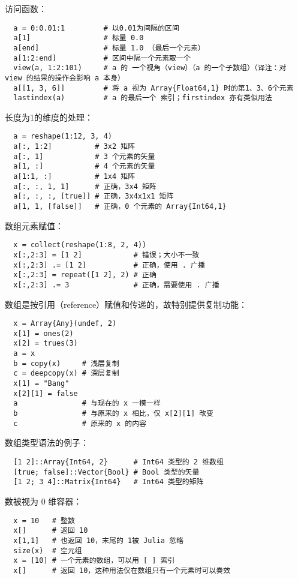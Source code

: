 \documentclass[10pt,a4paper]{article}
\begin{document}
访问函数：
\begin{lstlisting}
  a = 0:0.01:1         # 以0.01为间隔的区间
  a[1]                 # 标量 0.0
  a[end]               # 标量 1.0 （最后一个元素）
  a[1:2:end]           # 区间中隔一个元素取一个
  view(a, 1:2:101)     # a 的 一个视角（view）（a 的一个子数组）（译注：对 view 的结果的操作会影响 a 本身）
  a[[1, 3, 6]]         # 将 a 视为 Array{Float64,1} 时的第1、3、6个元素
  lastindex(a)         # a 的最后一个 索引；firstindex 亦有类似用法 
\end{lstlisting}

长度为1的维度的处理：
\begin{lstlisting}
  a = reshape(1:12, 3, 4)
  a[:, 1:2]          # 3x2 矩阵
  a[:, 1]            # 3 个元素的矢量
  a[1, :]            # 4 个元素的矢量
  a[1:1, :]          # 1x4 矩阵
  a[:, :, 1, 1]      # 正确，3x4 矩阵
  a[:, :, :, [true]] # 正确，3x4x1x1 矩阵
  a[1, 1, [false]]   # 正确，0 个元素的 Array{Int64,1}
\end{lstlisting}

数组元素赋值：
\begin{lstlisting}
  x = collect(reshape(1:8, 2, 4))
  x[:,2:3] = [1 2]            # 错误；大小不一致
  x[:,2:3] .= [1 2]           # 正确，使用 . 广播
  x[:,2:3] = repeat([1 2], 2) # 正确
  x[:,2:3] .= 3               # 正确，需要使用 . 广播
\end{lstlisting}

数组是按引用（reference）赋值和传递的，故特别提供复制功能：
\begin{lstlisting}
  x = Array{Any}(undef, 2)
  x[1] = ones(2)
  x[2] = trues(3)
  a = x
  b = copy(x)     # 浅层复制
  c = deepcopy(x) # 深层复制
  x[1] = "Bang"
  x[2][1] = false
  a               # 与现在的 x 一模一样
  b               # 与原来的 x 相比，仅 x[2][1] 改变
  c               # 原来的 x 的内容
\end{lstlisting}

数组类型语法的例子：
\begin{lstlisting}
  [1 2]::Array{Int64, 2}      # Int64 类型的 2 维数组
  [true; false]::Vector{Bool} # Bool 类型的矢量
  [1 2; 3 4]::Matrix{Int64}   # Int64 类型的矩阵
\end{lstlisting}

数被视为 0 维容器：
\begin{lstlisting}
  x = 10   # 整数
  x[]      # 返回 10
  x[1,1]   # 也返回 10，末尾的 1被 Julia 忽略
  size(x)  # 空元组
  x = [10] # 一个元素的数组，可以用 [ ] 索引
  x[]      # 返回 10，这种用法仅在数组只有一个元素时可以奏效
\end{lstlisting}
\end{document}
